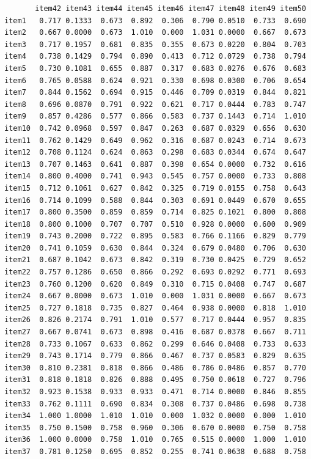 \documentclass[
  a4paper,
]{ltjsbook}
\begin{document}
\begin{verbatim}
       item42 item43 item44 item45 item46 item47 item48 item49 item50
item1   0.717 0.1333  0.673  0.892  0.306  0.790 0.0510  0.733  0.690
item2   0.667 0.0000  0.673  1.010  0.000  1.031 0.0000  0.667  0.673
item3   0.717 0.1957  0.681  0.835  0.355  0.673 0.0220  0.804  0.703
item4   0.738 0.1429  0.794  0.890  0.413  0.712 0.0729  0.738  0.794
item5   0.730 0.1081  0.655  0.887  0.317  0.683 0.0276  0.676  0.683
item6   0.765 0.0588  0.624  0.921  0.330  0.698 0.0300  0.706  0.654
item7   0.844 0.1562  0.694  0.915  0.446  0.709 0.0319  0.844  0.821
item8   0.696 0.0870  0.791  0.922  0.621  0.717 0.0444  0.783  0.747
item9   0.857 0.4286  0.577  0.866  0.583  0.737 0.1443  0.714  1.010
item10  0.742 0.0968  0.597  0.847  0.263  0.687 0.0329  0.656  0.630
item11  0.762 0.1429  0.649  0.962  0.316  0.687 0.0243  0.714  0.673
item12  0.708 0.1124  0.624  0.863  0.298  0.683 0.0344  0.674  0.647
item13  0.707 0.1463  0.641  0.887  0.398  0.654 0.0000  0.732  0.616
item14  0.800 0.4000  0.741  0.943  0.545  0.757 0.0000  0.733  0.808
item15  0.712 0.1061  0.627  0.842  0.325  0.719 0.0155  0.758  0.643
item16  0.714 0.1099  0.588  0.844  0.303  0.691 0.0449  0.670  0.655
item17  0.800 0.3500  0.859  0.859  0.714  0.825 0.1021  0.800  0.808
item18  0.800 0.1000  0.707  0.707  0.510  0.928 0.0000  0.600  0.909
item19  0.743 0.2000  0.722  0.895  0.583  0.766 0.1166  0.829  0.779
item20  0.741 0.1059  0.630  0.844  0.324  0.679 0.0480  0.706  0.630
item21  0.687 0.1042  0.673  0.842  0.319  0.730 0.0425  0.729  0.652
item22  0.757 0.1286  0.650  0.866  0.292  0.693 0.0292  0.771  0.693
item23  0.760 0.1200  0.620  0.849  0.310  0.715 0.0408  0.747  0.687
item24  0.667 0.0000  0.673  1.010  0.000  1.031 0.0000  0.667  0.673
item25  0.727 0.1818  0.735  0.827  0.464  0.938 0.0000  0.818  1.010
item26  0.826 0.2174  0.791  1.010  0.577  0.717 0.0444  0.957  0.835
item27  0.667 0.0741  0.673  0.898  0.416  0.687 0.0378  0.667  0.711
item28  0.733 0.1067  0.633  0.862  0.299  0.646 0.0408  0.733  0.633
item29  0.743 0.1714  0.779  0.866  0.467  0.737 0.0583  0.829  0.635
item30  0.810 0.2381  0.818  0.866  0.486  0.786 0.0486  0.857  0.770
item31  0.818 0.1818  0.826  0.888  0.495  0.750 0.0618  0.727  0.796
item32  0.923 0.1538  0.933  0.933  0.471  0.714 0.0000  0.846  0.855
item33  0.762 0.1111  0.690  0.834  0.308  0.737 0.0486  0.698  0.738
item34  1.000 1.0000  1.010  1.010  0.000  1.032 0.0000  0.000  1.010
item35  0.750 0.1500  0.758  0.960  0.306  0.670 0.0000  0.750  0.758
item36  1.000 0.0000  0.758  1.010  0.765  0.515 0.0000  1.000  1.010
item37  0.781 0.1250  0.695  0.852  0.255  0.741 0.0638  0.688  0.758

\end{verbatim}
\end{document}
